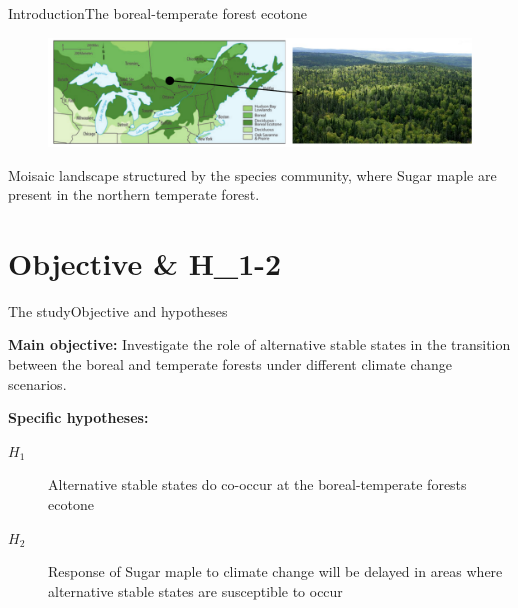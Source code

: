 \documentclass[table]{eecslides}
\begin{document}
\begin{frame}{Introduction}{The boreal-temperate forest ecotone}
	\begin{figure}
		\includegraphics[width=.85\paperwidth]{Figs/ecotone_structure.pdf}
		\caption*{\scriptsize{\cite{Goldblum2010}}}
	\end{figure}

	\begin{center}
		Moisaic landscape structured by the species community, where Sugar maple are present in the northern temperate forest. \\
	\end{center}
\end{frame}

\section{Objective \& H_{1-2}}

\begin{frame}{The study}{Objective and hypotheses}

\textbf{Main objective:} Investigate the role of alternative stable states in the transition between the boreal and
temperate forests under different climate change scenarios.

\pause
\vfill

\textbf{Specific hypotheses: }

\begin{description}
	\item [$H_1$] Alternative stable states do co-occur at the boreal-temperate forests ecotone
	\pause
	\item [$H_2$] Response of Sugar maple to climate change will be delayed in areas where alternative stable states are susceptible to occur
\end{description}

\end{frame}

\end{document}
